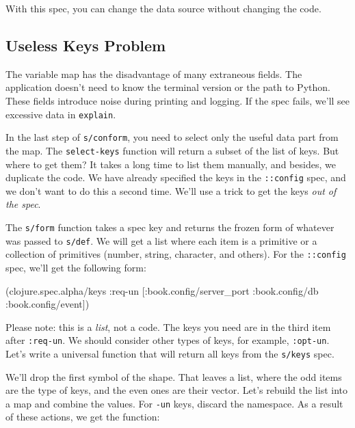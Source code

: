 \noindent
With this spec, you can change the data source without changing the code.

\subsection{Useless Keys Problem}

The variable map has the disadvantage of many extraneous fields. The application doesn't need to know the terminal version or the path to Python. These fields introduce noise during printing and logging. If the spec fails, we'll see excessive data in \verb|explain|.


In the last step of \verb|s/conform|, you need to select only the useful data part from the map. The \verb|select-keys| function will return a subset of the list of keys. But where to get them? It takes a long time to list them manually, and besides, we duplicate the code. We have already specified the keys in the \verb|::config| spec, and we don't want to do this a second time. We'll use a trick to get the keys \emph{out of the spec}.

The \verb|s/form| function takes a spec key and returns the frozen form of whatever was passed to \verb|s/def|. We will get a list where each item is a primitive or a collection of primitives (number, string, character, and others).
For the \verb|::config| spec, we'll get the following form:

\begin{clojure}
(clojure.spec.alpha/keys
 :req-un [:book.config/server_port
          :book.config/db
          :book.config/event])
\end{clojure}


Please note: this is a \emph{list}, not a code. The keys you need are in the third item after \verb|:req-un|. We should consider other types of keys, for example, \verb|:opt-un|. Let's write a universal function that will return all keys from the \verb|s/keys| spec.

We'll drop the first symbol of the shape.  That leaves a list, where the odd items are the type of keys, and the even ones are their vector. Let's rebuild the list into a map and combine the values. For \verb|-un| keys, discard the namespace. As a result of these actions, we get the function:


